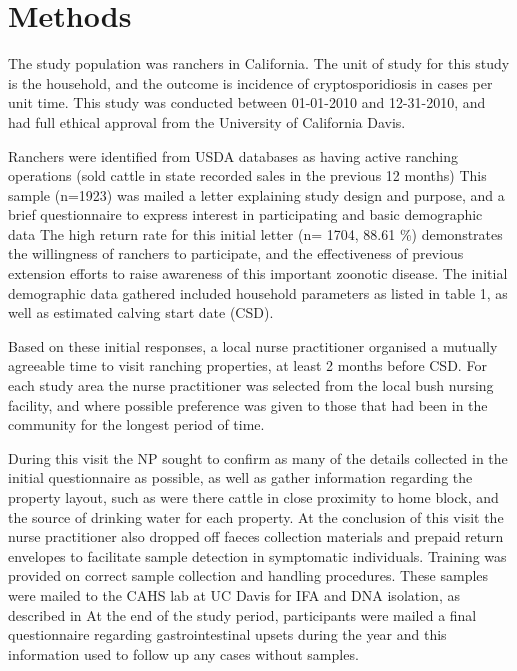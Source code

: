 \documentclass[12pt]{article}
\begin{document}
	\section{Methods} 
		The study population was ranchers in California. 
		The unit of study for this study is the household, and the outcome is incidence of cryptosporidiosis in cases per unit time.
		This study was conducted between 01-01-2010 and 12-31-2010, and had full ethical approval from the University of California Davis.


		Ranchers were identified from USDA databases as having active ranching operations (sold cattle in state recorded sales in the previous 12 months)
		This sample (n=1923) was mailed a letter explaining study design and purpose, and a brief questionnaire to express interest in participating and basic demographic data 
		The high return rate for this initial letter (n= 1704, 88.61 \%) demonstrates the willingness of ranchers to participate, and the effectiveness of previous extension efforts to raise awareness of this important zoonotic disease. 
		The initial demographic data gathered included household parameters as listed in table 1, as well as estimated calving start date (CSD).


		Based on these initial responses, a local nurse practitioner organised a mutually agreeable time to visit ranching properties, at least 2 months before CSD.	%
		For each study area the nurse practitioner was selected from the local bush nursing facility, and where possible preference was given to those that had been in the community for the longest period of time.


		During this visit the NP sought to confirm as many of the details collected in the initial questionnaire as possible, as well as gather information regarding the property layout, such as were there cattle in close proximity to home block, and the source of drinking water for each property.
		At the conclusion of this visit the nurse practitioner also dropped off faeces collection materials and prepaid return envelopes to facilitate sample detection in symptomatic individuals. 		%
		Training was provided on correct sample collection and handling procedures.
		These samples were mailed to the CAHS lab at UC Davis for IFA and DNA isolation,  as described in \cite{Atwill1999}
		At the end of the study period, participants were mailed a final questionnaire regarding gastrointestinal upsets during the year and this information used to follow up any cases without samples.
		
\end{document}
